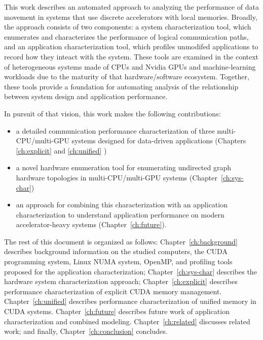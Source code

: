 This work describes an automated approach to analyzing the performance of data movement in systems that use discrete accelerators with local memories.
Broadly, the approach consists of two components: a system characterization tool, which enumerates and characterizes the performance of logical communication paths, and an application characterization tool, which profiles unmodifed applications to record how they inteact with the system.
These tools are examined in the context of heterogeneous systems made of CPUs and Nvidia GPUs and machine-learning workloads due to the maturity of that hardware/software ecosystem.
Together, these tools provide a foundation for automating analysis of the relationship between system design and application performance.

In pursuit of that vision, this work makes the following contributions:
\begin{itemize}
 \item a detailed communication performance characterization of three multi-CPU/multi-GPU systems designed for data-driven applications (Chapters \ref{ch:explicit} and \ref{ch:unified} )
 \item a novel hardware enumeration tool for enumerating undirected graph hardware topologies in multi-CPU/multi-GPU systems (Chapter~\ref{ch:sys-char})
 \item an approach for combining this characterization with an application characterization to understand application performance on modern accelerator-heavy systems (Chapter~\ref{ch:future}).
\end{itemize}

The rest of this document is organized as follows:
Chapter~\ref{ch:background} describes background information on the studied computers, the CUDA programming system, Linux NUMA system, OpenMP, and profiling tools proposed for the application characterization;
Chapter~\ref{ch:sys-char} describes the hardware system characterization approach;
Chapter~\ref{ch:explicit} describes performance characterization of explicit CUDA memory management.
Chapter~\ref{ch:unified} describes performance characterization of unified memory in CUDA systems.
Chapter~\ref{ch:future} describes future work of application characterization and combined modeling.
Chapter~\ref{ch:related} discusses related work;
and finally, Chapter~\ref{ch:conclusion} concludes.
